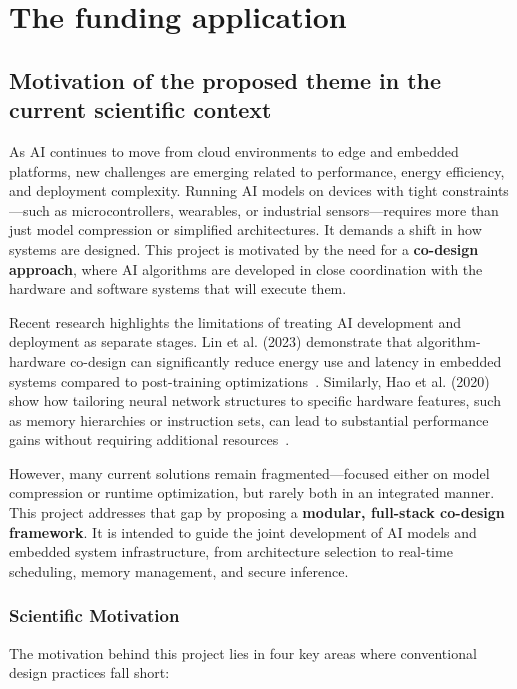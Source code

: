 \chapter{The funding application}

\section{Motivation of the proposed theme in the current scientific context}

As AI continues to move from cloud environments to edge and embedded platforms, new challenges are emerging related to performance, energy efficiency, and deployment complexity. Running AI models on devices with tight constraints—such as microcontrollers, wearables, or industrial sensors—requires more than just model compression or simplified architectures. It demands a shift in how systems are designed. This project is motivated by the need for a \textbf{co-design approach}, where AI algorithms are developed in close coordination with the hardware and software systems that will execute them.

Recent research highlights the limitations of treating AI development and deployment as separate stages. Lin et al. (2023) demonstrate that algorithm-hardware co-design can significantly reduce energy use and latency in embedded systems compared to post-training optimizations~\cite{lin2023codesign}. Similarly, Hao et al. (2020) show how tailoring neural network structures to specific hardware features, such as memory hierarchies or instruction sets, can lead to substantial performance gains without requiring additional resources~\cite{hao2020fpga}.

However, many current solutions remain fragmented—focused either on model compression or runtime optimization, but rarely both in an integrated manner. This project addresses that gap by proposing a \textbf{modular, full-stack co-design framework}. It is intended to guide the joint development of AI models and embedded system infrastructure, from architecture selection to real-time scheduling, memory management, and secure inference.

\subsection{Scientific Motivation}

The motivation behind this project lies in four key areas where conventional design practices fall short:

